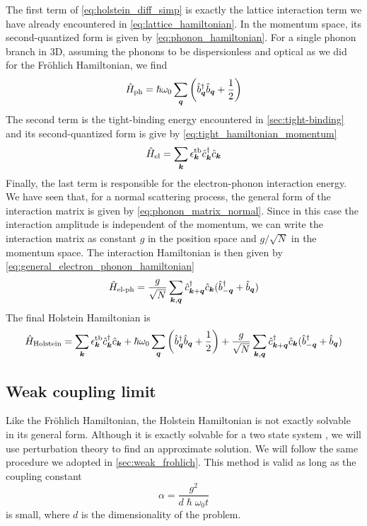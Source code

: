 The first term of \cref{eq:holstein_diff_simp} is exactly the lattice interaction term we have already encountered in \cref{eq:lattice_hamiltonian}. In the momentum space, its second-quantized form is given by \cref{eq:phonon_hamiltonian}. For a single phonon branch in 3D, assuming the phonons to be dispersionless and optical as we did for the Fröhlich Hamiltonian, we find
\begin{equation}
    \hat{H}_\text{ph} = \hslash \omega_0\sum_{\mathbf{\boldsymbol{q}}}  \left( \hat{b}^\dagger_{\mathbf{\boldsymbol{q}}} \hat{b}_{\mathbf{\boldsymbol{q}}} + \frac{1}{2} \right)
\end{equation}
The second term is the tight-binding energy encountered in \cref{sec:tight-binding} and its second-quantized form is give by \cref{eq:tight_hamiltonian_momentum}
\begin{equation}
    \hat{H}_\text{el} = \sum_{\mathbf{\boldsymbol{k}}} \epsilon_{\mathbf{\boldsymbol{k}}}^\text{tb} \hat{c}^\dagger_{\mathbf{\boldsymbol{k}}}\hat{c}_{\mathbf{\boldsymbol{k}}}
\end{equation}
Finally, the last term is responsible for the electron-phonon interaction energy. We have seen that, for a normal scattering process, the general form of the interaction matrix is given by \cref{eq:phonon_matrix_normal}. Since in this case the interaction amplitude is independent of the momentum, we can write the interaction matrix as constant $g$ in the position space and $g / \sqrt{N}$ in the momentum space. The interaction Hamiltonian is then given by \cref{eq:general_electron_phonon_hamiltonian}
\begin{equation}
    \hat{H}_\text{el-ph} = \frac{g}{\sqrt{N}}\sum_{\mathbf{\boldsymbol{k}}, \mathbf{\boldsymbol{q}}} \hat{c}^\dagger_{\mathbf{\boldsymbol{k}}+\mathbf{\boldsymbol{q}}} \hat{c}_{\mathbf{\boldsymbol{k}}} (\hat{b}^\dagger_{-\mathbf{\boldsymbol{q}}} + \hat{b}_{\mathbf{\boldsymbol{q}}})
\end{equation}
The final Holstein Hamiltonian is
\begin{equation}
    \hat{H}_\text{Holstein} = \sum_{\mathbf{\boldsymbol{k}}} \epsilon_{\mathbf{\boldsymbol{k}}}^\text{tb} \hat{c}^\dagger_{\mathbf{\boldsymbol{k}}}\hat{c}_{\mathbf{\boldsymbol{k}}} + \hslash \omega_0\sum_{\mathbf{\boldsymbol{q}}}  \left( \hat{b}^\dagger_{\mathbf{\boldsymbol{q}}} \hat{b}_{\mathbf{\boldsymbol{q}}} + \frac{1}{2} \right) + \frac{g}{\sqrt{N}}\sum_{\mathbf{\boldsymbol{k}}, \mathbf{\boldsymbol{q}}} \hat{c}^\dagger_{\mathbf{\boldsymbol{k}}+\mathbf{\boldsymbol{q}}} \hat{c}_{\mathbf{\boldsymbol{k}}} (\hat{b}^\dagger_{-\mathbf{\boldsymbol{q}}} + \hat{b}_{\mathbf{\boldsymbol{q}}})
\end{equation}

\subsection{Weak coupling limit}
Like the Fröhlich Hamiltonian, the Holstein Hamiltonian is not exactly solvable in its general form. Although it is exactly solvable for a two state system \cite{tayebi2016}, we will use perturbation theory to find an approximate solution. We will follow the same procedure we adopted in \cref{sec:weak_frohlich}. This method is valid as long as the coupling constant
\begin{equation}
    \alpha = \frac{g^2}{d\hslash\omega_0t}
\end{equation}
is small, where $d$ is the dimensionality of the problem.

